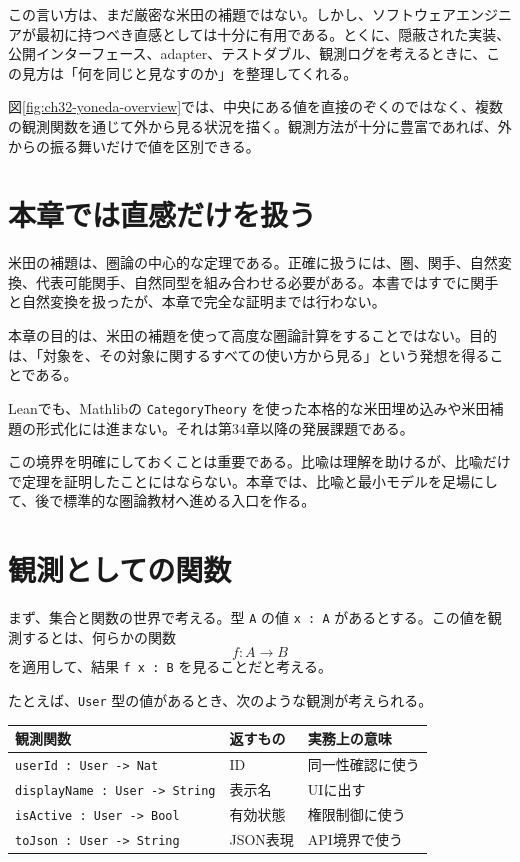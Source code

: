 この言い方は、まだ厳密な米田の補題ではない。しかし、ソフトウェアエンジニアが最初に持つべき直感としては十分に有用である。とくに、隠蔽された実装、公開インターフェース、adapter、テストダブル、観測ログを考えるときに、この見方は「何を同じと見なすのか」を整理してくれる。


図\ref{fig:ch32-yoneda-overview}では、中央にある値を直接のぞくのではなく、複数の観測関数を通じて外から見る状況を描く。観測方法が十分に豊富であれば、外からの振る舞いだけで値を区別できる。

\section{本章では直感だけを扱う}

米田の補題は、圏論の中心的な定理である。正確に扱うには、圏、関手、自然変換、代表可能関手、自然同型を組み合わせる必要がある。本書ではすでに関手と自然変換を扱ったが、本章で完全な証明までは行わない。

\begin{warningbox}
本章の目的は、米田の補題を使って高度な圏論計算をすることではない。目的は、「対象を、その対象に関するすべての使い方から見る」という発想を得ることである。

Leanでも、Mathlibの \texttt{CategoryTheory} を使った本格的な米田埋め込みや米田補題の形式化には進まない。それは第34章以降の発展課題である。
\end{warningbox}

この境界を明確にしておくことは重要である。比喩は理解を助けるが、比喩だけで定理を証明したことにはならない。本章では、比喩と最小モデルを足場にして、後で標準的な圏論教材へ進める入口を作る。

\section{観測としての関数}

まず、集合と関数の世界で考える。型 \texttt{A} の値 \texttt{x : A} があるとする。この値を観測するとは、何らかの関数
\[
  f : A \to B
\]
を適用して、結果 \texttt{f x : B} を見ることだと考える。

たとえば、\texttt{User} 型の値があるとき、次のような観測が考えられる。

\begin{center}
\begin{tabular}{lll}
\toprule
観測関数 & 返すもの & 実務上の意味 \\
\midrule
\texttt{userId : User -> Nat} & ID & 同一性確認に使う \\
\texttt{displayName : User -> String} & 表示名 & UIに出す \\
\texttt{isActive : User -> Bool} & 有効状態 & 権限制御に使う \\
\texttt{toJson : User -> String} & JSON表現 & API境界で使う \\
\bottomrule
\end{tabular}
\end{center}

